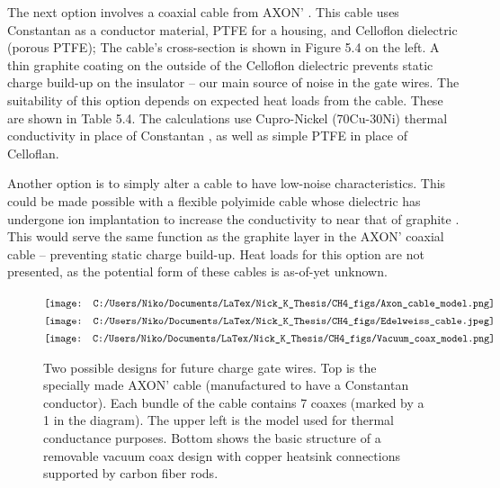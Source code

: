 \documentclass{report}
\begin{document}
The next option involves a coaxial cable from AXON' \footnotemark.
This cable uses Constantan as a conductor material, PTFE for a housing, and Celloflon dielectric (porous PTFE); The cable's cross-section is shown in Figure 5.4 on the left. A thin graphite coating on the outside of the Celloflon dielectric prevents static charge build-up on the insulator -- our main source of noise in the gate wires. The suitability of this option depends on expected heat loads from the cable. These are shown in Table 5.4. The calculations use Cupro-Nickel (70Cu-30Ni) thermal conductivity in place of Constantan \footnotemark, as well as simple PTFE in place of Celloflan.


Another option is to simply alter a cable to have low-noise characteristics. This could be made possible with a flexible polyimide cable whose dielectric has undergone ion implantation to increase the conductivity to near that of graphite \footnotemark. This would serve the same function as the graphite layer in the AXON' coaxial cable -- preventing static charge build-up. Heat loads for this option are not presented, as the potential form of these cables is as-of-yet unknown.


\begin{figure}[h]
\centering
$\vcenter{\hbox{\texttt{[image: C:/Users/Niko/Documents/LaTex/Nick\_K\_Thesis/CH4\_figs/Axon\_cable\_model.png]}}}$
$\vcenter{\hbox{\texttt{[image: C:/Users/Niko/Documents/LaTex/Nick\_K\_Thesis/CH4\_figs/Edelweiss\_cable.jpeg]}}}$
$\vcenter{\hbox{\texttt{[image: C:/Users/Niko/Documents/LaTex/Nick\_K\_Thesis/CH4\_figs/Vacuum\_coax\_model.png]}}}$
\caption{Two possible designs for future charge gate wires. Top is the specially made AXON' cable (manufactured to have a Constantan conductor). Each bundle of the cable contains 7 coaxes (marked by a 1 in the diagram). The upper left is the model used for thermal conductance purposes. Bottom shows the basic structure of a removable vacuum coax design with copper heatsink connections supported by carbon fiber rods.}
\end{figure}
\end{document}
